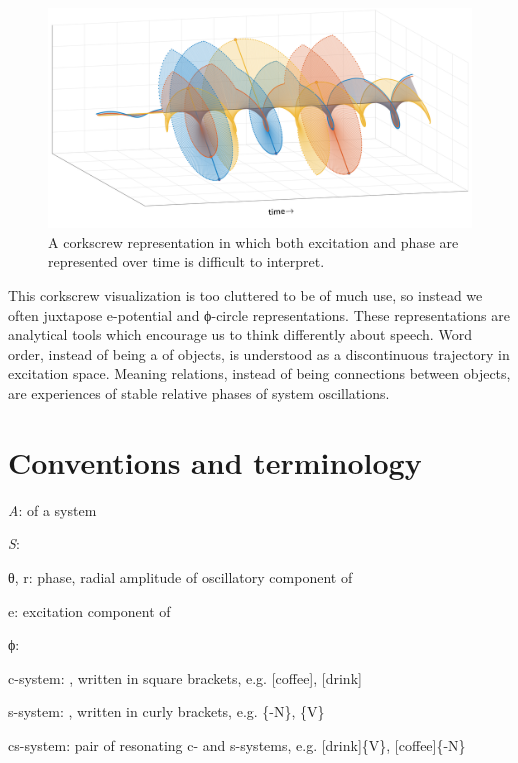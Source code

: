   
\begin{figure}
\includegraphics[width=\textwidth]{figures/Tilsen-img28.png}
\caption{A corkscrew representation in which both excitation and phase are represented over time is difficult to interpret.}
\label{fig:2:21}
\end{figure}
 

  This corkscrew visualization is too cluttered to be of much use, so instead we often juxtapose e-potential and ϕ{}-circle representations. These representations are analytical tools which encourage us to think differently about speech. Word order, instead of being a  of objects, is understood as a discontinuous trajectory in excitation space. Meaning relations, instead of being connections between objects, are experiences of stable relative phases of system oscillations.

\section{Conventions and terminology}

\textit{A}:  of a system

\noindent \textit{S}: 

\noindent θ, r: phase, radial amplitude of oscillatory component of 

\noindent e: excitation component of 

\noindent ϕ: 

\noindent c-system: , written in square brackets, e.g. [coffee], [drink]

\noindent s-system: , written in curly brackets, e.g. \{-N\}, \{V\}

\noindent cs-system: pair of resonating c- and s-systems, e.g. [drink]\{V\}, [coffee]\{-N\}

